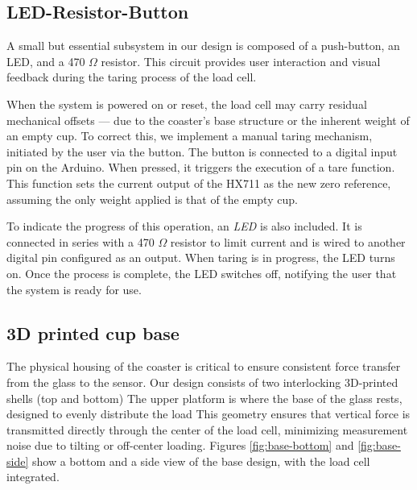 \subsection{LED-Resistor-Button}
A small but essential subsystem in our design is composed of a push-button, an LED, and a 470 $\Omega$ resistor. This circuit provides user interaction and visual feedback during the taring process of the load cell.

When the system is powered on or reset, the load cell may carry residual mechanical offsets — due to the coaster’s base structure or the inherent weight of an empty cup. To correct this, we implement a manual taring mechanism, initiated by the user via the button.
The button is connected to a digital input pin on the Arduino. When pressed, it triggers the execution of a tare function. This function sets the current output of the HX711 as the new zero reference, assuming the only weight applied is that of the empty cup.

To indicate the progress of this operation, an \textit{LED} is also included. It is connected in series with a 470 $\Omega$ resistor to limit current and is wired to another digital pin configured as an output. When taring is in progress, the LED turns on. Once the process is complete, the LED switches off, notifying the user that the system is ready for use.

\subsection{3D printed cup base}
The physical housing of the coaster is critical to ensure consistent force transfer from the glass to the sensor. Our design consists of two interlocking 3D-printed shells (top and bottom) The upper platform is where the base of the glass rests, designed to evenly distribute the load
This geometry ensures that vertical force is transmitted directly through the center of the load cell, minimizing measurement noise due to tilting or off-center loading. Figures \ref{fig:base-bottom} and \ref{fig:base-side} show a bottom and a side view of the base design, with the load cell integrated.

